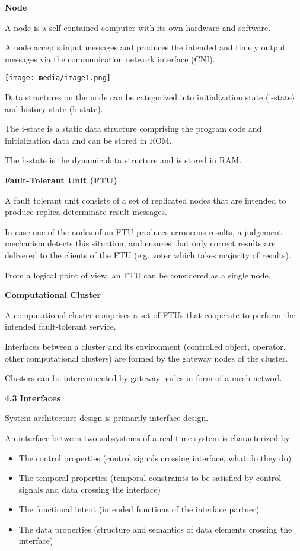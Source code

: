 \textbf{Node}

A node is a self-contained computer with its own hardware and software.

A node accepts input messages and produces the intended and timely
output messages via the communication network interface (CNI).

\texttt{[image: media/image1.png]}

Data structures on the node can be categorized into initialization state
(i-state) and history state (h-state).

The i-state is a static data structure comprising the program code and
initialization data and can be stored in ROM.

The h-state is the dynamic data structure and is stored in RAM.

\textbf{Fault-Tolerant Unit (FTU)}

A fault tolerant unit consists of a set of replicated nodes that are
intended to produce replica determinate result messages.

In case one of the nodes of an FTU produces erroneous results, a
judgement mechanism detects this situation, and ensures that only
correct results are delivered to the clients of the FTU (e.g. voter
which takes majority of results).

From a logical point of view, an FTU can be considered as a single node.

\textbf{Computational Cluster}

A computational cluster comprises a set of FTUs that cooperate to
perform the intended fault-tolerant service.

Interfaces between a cluster and its environment (controlled object,
operator, other computational clusters) are formed by the gateway nodes
of the cluster.

Clusters can be interconnected by gateway nodes in form of a mesh
network.

\textbf{4.3} \protect\hypertarget{teil4}{}{}\textbf{Interfaces }

System architecture design is primarily interface design.

An interface between two subsystems of a real-time system is
characterized by

\begin{itemize}
\item
  The control properties (control signals crossing interface, what do
  they do)
\item
  The temporal properties (temporal constraints to be satisfied by
  control signals and data crossing the interface)
\item
  The functional intent (intended functions of the interface partner)
\item
  The data properties (structure and semantics of data elements crossing
  the interface)
\end{itemize}


